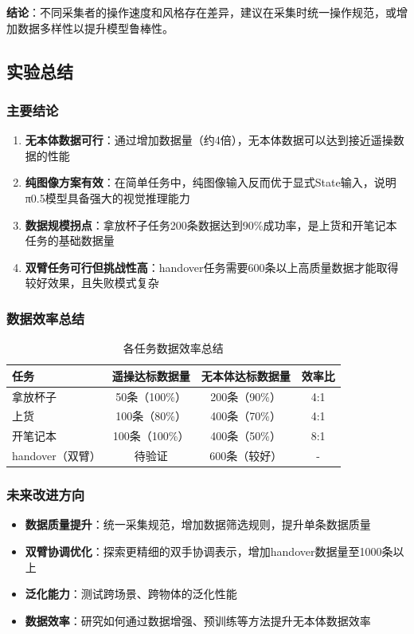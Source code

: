 \textbf{结论}：不同采集者的操作速度和风格存在差异，建议在采集时统一操作规范，或增加数据多样性以提升模型鲁棒性。

\subsection{实验总结}

\subsubsection{主要结论}

\begin{enumerate}[leftmargin=2em]
    \item \textbf{无本体数据可行}：通过增加数据量（约4倍），无本体数据可以达到接近遥操数据的性能
    \item \textbf{纯图像方案有效}：在简单任务中，纯图像输入反而优于显式State输入，说明π0.5模型具备强大的视觉推理能力
    \item \textbf{数据规模拐点}：拿放杯子任务200条数据达到90\%成功率，是上货和开笔记本任务的基础数据量
    \item \textbf{双臂任务可行但挑战性高}：handover任务需要600条以上高质量数据才能取得较好效果，且失败模式复杂
\end{enumerate}

\subsubsection{数据效率总结}

\begin{table}[htbp]
\centering
\caption{各任务数据效率总结}
\label{tab:data_efficiency_summary}
\begin{tabular}{lccc}
\toprule
任务 & 遥操达标数据量 & 无本体达标数据量 & 效率比 \\
\midrule
拿放杯子 & 50条（100\%） & 200条（90\%） & 4:1 \\
上货 & 100条（80\%） & 400条（70\%） & 4:1 \\
开笔记本 & 100条（100\%） & 400条（50\%） & 8:1 \\
handover（双臂） & 待验证 & 600条（较好） & - \\
\bottomrule
\end{tabular}
\end{table}

\subsubsection{未来改进方向}

\begin{itemize}[leftmargin=2em]
    \item \textbf{数据质量提升}：统一采集规范，增加数据筛选规则，提升单条数据质量
    \item \textbf{双臂协调优化}：探索更精细的双手协调表示，增加handover数据量至1000条以上
    \item \textbf{泛化能力}：测试跨场景、跨物体的泛化性能
    \item \textbf{数据效率}：研究如何通过数据增强、预训练等方法提升无本体数据效率
\end{itemize}


